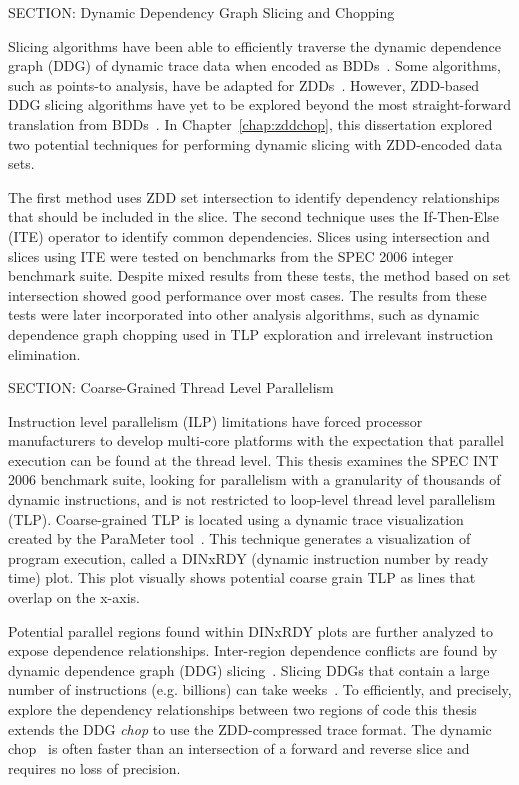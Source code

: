 {SECTION: Dynamic Dependency Graph Slicing and Chopping


Slicing algorithms have been able to efficiently traverse the dynamic dependence graph (DDG) of dynamic trace data when encoded as BDDs~\cite{price:08:pact}.  Some algorithms, such as points-to analysis, have be adapted for ZDDs~\cite{lhotak:08:lcpc}.  However, ZDD-based DDG slicing algorithms have yet to be explored beyond the most straight-forward translation from BDDs~\cite{price:10:cgo}. In Chapter~\ref{chap:zddchop}, this dissertation explored two potential techniques for performing dynamic slicing with ZDD-encoded data sets.

The first method uses ZDD set intersection to identify dependency relationships that should be included in the slice.  The second technique uses the If-Then-Else (ITE) operator to identify common dependencies.  Slices using intersection and slices using ITE were tested on benchmarks from the SPEC 2006 integer benchmark suite. Despite mixed results from these tests, the method based on set intersection showed good performance over most cases.  The results from these tests were later incorporated into other analysis algorithms, such as dynamic dependence graph chopping used in TLP exploration and irrelevant instruction elimination.

SECTION: Coarse-Grained Thread Level Parallelism


Instruction level parallelism (ILP) limitations have forced processor manufacturers to develop multi-core platforms with the expectation that parallel execution can be found at the thread level. This thesis examines the SPEC INT 2006 benchmark suite, looking for parallelism with a granularity of thousands of dynamic instructions, and is not restricted to loop-level thread level parallelism (TLP). Coarse-grained TLP is located using a dynamic trace visualization created by the ParaMeter tool~\cite{price:08:pact}.  This technique generates a visualization of program execution, called a DINxRDY (dynamic instruction number by ready time) plot.  This plot visually shows potential coarse grain TLP as lines that overlap on the x-axis.

Potential parallel regions found within DINxRDY plots are further analyzed to expose dependence relationships.  Inter-region dependence conflicts are found by dynamic dependence graph (DDG) slicing~\cite{gallager:91:se,agrawal:90:pldi,agrawal:92:thesis,korel:88:ipl}. Slicing DDGs that contain a large number of instructions (e.g. billions) can take weeks~\cite{agrawal:90:pldi, zhang:03:icse}. To efficiently, and precisely, explore the dependency relationships between two regions of code this thesis extends the DDG \textit{chop} to use the ZDD-compressed trace format.  The dynamic chop~\cite{gupta:2005:ase, krinke:2004:sqc} is often faster than an intersection of a forward and reverse slice and requires no loss of precision.

}
